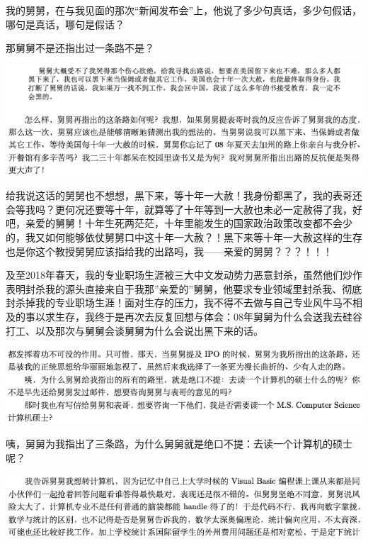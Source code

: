 \documentclass[9pt, b5paper]{article}
\begin{document}
我的舅舅，在与我见面的那次“新闻发布会”上，他说了多少句真话，多少句假话，哪句是真话，哪句是假话？

那舅舅不是还指出过一条路不是？

\begin{center}
\includegraphics[width=.9\linewidth]{./pic/backups_plans_20210416_082312.png}
\end{center}

给我说这话的舅舅也不想想，黑下来，等十年一大赦！我身份都黑了，我的表哥还会等我吗？更何况还要等十年，就算等了十年等到一大赦也未必一定赦得了我，好吧，亲爱的舅舅！十年生死两茫茫，十年里能发生的国家政治政策改变都不会少的，我又如何能够依仗舅舅口中这十年一大赦？！黑下来等十年一大赦这样的生存也是你这个教授舅舅应该指给我的出路吗，我——亲爱的舅舅？？？！！！

及至2018年春天，我的专业职场生涯被三大中文发动势力恶意封杀，虽然他们炒作表明封杀我的源头直接来自于我那”亲爱的”舅舅，他要求专业领域里封杀我、彻底封杀掉我的专业职场生涯！面对生存的压力，我不得不去做与自己专业风牛马不相及的事以求生存，我终于是再次去反复回想与体会：08年舅舅为什么会送我去硅谷打工、以及那次与舅舅会谈舅舅为什么会说出黑下来的话。 

\begin{center}
\includegraphics[width=.9\linewidth]{./pic/backups_plans_20210416_100706.png}
\end{center}

咦，舅舅为我指出了三条路，为什么舅舅就是绝口不提：去读一个计算机的硕士呢？

\begin{center}
\includegraphics[width=.9\linewidth]{./pic/backups_plans_20210416_101207.png}
\end{center}
\end{document}

